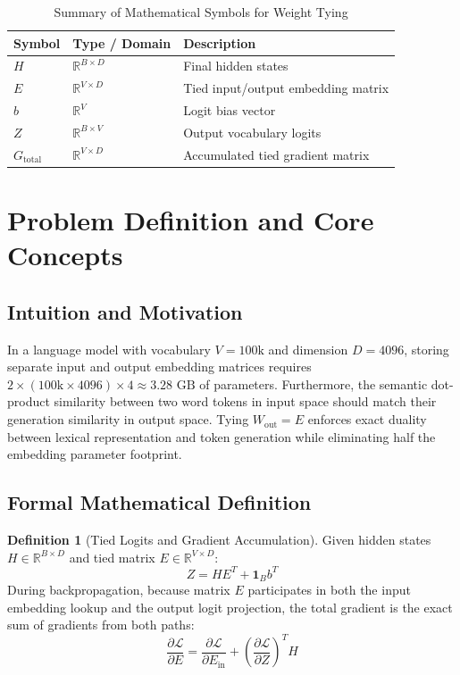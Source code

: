 \documentclass[11pt,a4paper]{article}
\theoremstyle{definition}
\newtheorem{definition}{Definition}[section]
\begin{document}
\begin{table}[h]
\centering
\caption{Summary of Mathematical Symbols for Weight Tying}
\begin{tabular}{lll}
\toprule
\textbf{Symbol} & \textbf{Type / Domain} & \textbf{Description} \\
\midrule
$H$ & $\mathbb{R}^{B \times D}$ & Final hidden states \\
$E$ & $\mathbb{R}^{V \times D}$ & Tied input/output embedding matrix \\
$b$ & $\mathbb{R}^V$ & Logit bias vector \\
$Z$ & $\mathbb{R}^{B \times V}$ & Output vocabulary logits \\
$G_{\text{total}}$ & $\mathbb{R}^{V \times D}$ & Accumulated tied gradient matrix \\
\bottomrule
\end{tabular}
\end{table}

\section{Problem Definition and Core Concepts}

\subsection{Intuition and Motivation}
In a language model with vocabulary $V = 100\text{k}$ and dimension $D = 4096$, storing separate input and output embedding matrices requires $2 \times (100\text{k} \times 4096) \times 4 \approx 3.28\text{ GB}$ of parameters. Furthermore, the semantic dot-product similarity between two word tokens in input space should match their generation similarity in output space. Tying $W_{\text{out}} = E$ enforces exact duality between lexical representation and token generation while eliminating half the embedding parameter footprint.

\subsection{Formal Mathematical Definition}
\begin{definition}[Tied Logits and Gradient Accumulation]
Given hidden states $H \in \mathbb{R}^{B \times D}$ and tied matrix $E \in \mathbb{R}^{V \times D}$:
\begin{equation}
Z = H E^T + \mathbf{1}_B b^T \label{eq:tied_forward}
\end{equation}
During backpropagation, because matrix $E$ participates in both the input embedding lookup and the output logit projection, the total gradient is the exact sum of gradients from both paths:
\begin{equation}
\frac{\partial \mathcal{L}}{\partial E} = \frac{\partial \mathcal{L}}{\partial E_{\text{in}}} + \left(\frac{\partial \mathcal{L}}{\partial Z}\right)^T H \label{eq:tied_grad}
\end{equation}
\end{definition}
\end{document}
